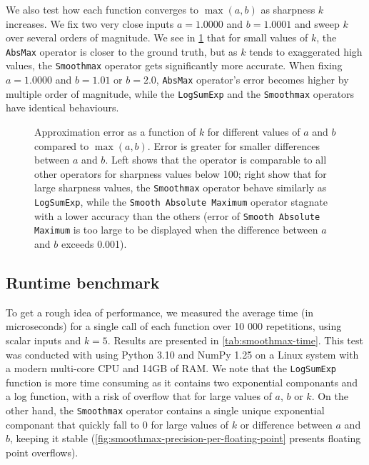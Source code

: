 We also test how each function converges to $\max(a, b)$ as sharpness $k$ increases. We fix two very close inputs $a = 1.0000$ and $b = 1.0001$ and sweep $k$ over several orders of magnitude. We see in \cref{fig:smoothmax-sharpness} that for small values of $k$, the \texttt{AbsMax} operator is closer to the ground truth, but as $k$ tends to exaggerated high values, the \texttt{Smoothmax} operator gets significantly more accurate. When fixing $a = 1.0000$ and $b = 1.01$ or $b = 2.0$, \texttt{AbsMax} operator's error becomes higher by multiple order of magnitude, while the \texttt{LogSumExp} and the \texttt{Smoothmax} operators have identical behaviours.

\begin{figure}
    \caption[Approximation error with the max operator]{Approximation error as a function of $k$ for different values of $a$ and $b$ compared to $\max(a, b)$. Error is greater for smaller differences between $a$ and $b$. Left shows that the operator is comparable to all other operators for sharpness values below 100; right show that for large sharpness values, the \texttt{Smoothmax} operator behave similarly as \texttt{LogSumExp}, while the \texttt{Smooth Absolute Maximum} operator stagnate with a lower accuracy than the others (error of \texttt{Smooth Absolute Maximum} is too large to be displayed when the difference between $a$ and $b$ exceeds 0.001). }
    \label{fig:smoothmax-sharpness}
\end{figure}

\subsection*{Runtime benchmark}

To get a rough idea of performance, we measured the average time (in microseconds) for a single call of each function over 10 000 repetitions, using scalar inputs and $k = 5$. Results are presented in \cref{tab:smoothmax-time}. This test was conducted with using Python 3.10 and NumPy 1.25 on a Linux system with a modern multi-core CPU and 14GB of RAM. We note that the \texttt{LogSumExp} function is more time consuming as it contains two exponential componants and a log function, with a risk of overflow that for large values of $a$, $b$ or $k$. On the other hand, the \texttt{Smoothmax} operator contains a single unique exponential componant that quickly fall to 0 for large values of $k$ or difference between $a$ and $b$, keeping it stable (\cref{fig:smoothmax-precision-per-floating-point} presents floating point overflows). 

